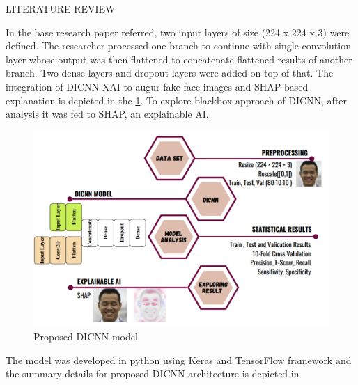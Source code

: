 \begin{section}[]{\uppercase{Literature Review}}
\par In the base research paper \cite{Bhandari2023} referred, two input layers of size (224 x 224 x 3) were defined. The researcher processed one branch to continue with single convolution layer whose output was then flattened to concatenate flattened results of another branch. Two dense layers and dropout layers were added on top of that.
The integration of DICNN-XAI to augur fake face images and SHAP based explanation is depicted in the \ref*{fig:proposed-dicnn}. To explore blackbox approach of DICNN, after analysis it was fed to SHAP, an explainable AI.
\begin{figure}[htbp]
    \centering
    \includegraphics[width=\linewidth]{images/proposed-dicnn.png}
    \caption{Proposed DICNN model}
    \label{fig:proposed-dicnn}
\end{figure}

The model was developed in python using Keras and TensorFlow framework and the summary details for proposed DICNN architecture is depicted in 


\end{section}
